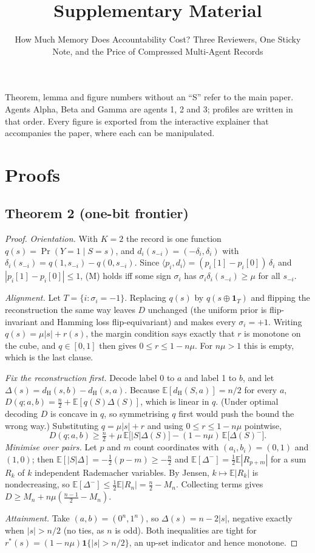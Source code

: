 \documentclass[sigconf,anonymous,acmthm=false]{acmart}
\theoremstyle{acmplain}
\theoremstyle{acmdefinition}
\newcommand{\E}{\mathbb{E}}
\newcommand{\dH}{d_{\mathrm{H}}}
\begin{document}
\title{Supplementary Material}
\subtitle{How Much Memory Does Accountability Cost? Three Reviewers, One Sticky Note, and the Price of Compressed Multi-Agent Records}
\maketitle

Theorem, lemma and figure numbers without an ``S'' refer to the main paper. Agents
\textsf{Alpha}, \textsf{Beta} and \textsf{Gamma} are agents 1, 2 and 3; profiles are written
in that order. Every figure is exported from the interactive explainer that accompanies the
paper, where each can be manipulated.

\appendix
\section{Proofs}

\subsection{Theorem 2 (one-bit frontier)}
\begin{proof}
\emph{Orientation.} With $K=2$ the record is one function $q(s)=\Pr(Y=1\mid S=s)$, and
$d_i(s_{-i})=(-\delta_i,\delta_i)$ with $\delta_i(s_{-i})=q(1,s_{-i})-q(0,s_{-i})$. Since
$\langle p_i,d_i\rangle=(p_i[1]-p_i[0])\,\delta_i$ and $|p_i[1]-p_i[0]|\le1$, (M) holds iff
some sign $\sigma_i$ has $\sigma_i\delta_i(s_{-i})\ge\mu$ for all $s_{-i}$.

\emph{Alignment.} Let $T=\{i:\sigma_i=-1\}$. Replacing $q(s)$ by $q(s\oplus\mathbf1_T)$ and
flipping the reconstruction the same way leaves $D$ unchanged (the uniform prior is
flip-invariant and Hamming loss flip-equivariant) and makes every $\sigma_i=+1$. Writing
$q(s)=\mu|s|+r(s)$, the margin condition says exactly that $r$ is monotone on the cube, and
$q\in[0,1]$ then gives $0\le r\le1-n\mu$. For $n\mu>1$ this is empty, which is the last clause.

\emph{Fix the reconstruction first.} Decode label 0 to $a$ and label 1 to $b$, and let
$\Delta(s)=\dH(s,b)-\dH(s,a)$. Because $\E[\dH(S,a)]=n/2$ for every $a$,
$D(q;a,b)=\frac n2+\E[q(S)\Delta(S)]$, which is linear in $q$. (Under optimal decoding $D$ is
concave in $q$, so symmetrising $q$ first would push the bound the wrong way.) Substituting
$q=\mu|s|+r$ and using $0\le r\le1-n\mu$ pointwise,
\[ D(q;a,b)\ge\tfrac n2+\mu\,\E\big[|S|\Delta(S)\big]-(1-n\mu)\,\E\big[\Delta(S)^-\big]. \]
\emph{Minimise over pairs.} Let $p$ and $m$ count coordinates with $(a_i,b_i)=(0,1)$ and
$(1,0)$; then $\E[|S|\Delta]=-\frac12(p-m)\ge-\frac n2$ and $\E[\Delta^-]=\frac12\E|R_{p+m}|$
for a sum $R_k$ of $k$ independent Rademacher variables. By Jensen, $k\mapsto\E|R_k|$ is
nondecreasing, so $\E[\Delta^-]\le\frac12\E|R_n|=\frac n2-M_n$. Collecting terms gives
$D\ge M_n+n\mu(\frac{n-1}2-M_n)$.

\emph{Attainment.} Take $(a,b)=(0^n,1^n)$, so $\Delta(s)=n-2|s|$, negative exactly when
$|s|>n/2$ (no ties, as $n$ is odd). Both inequalities are tight for
$r^*(s)=(1-n\mu)\mathbf1\{|s|>n/2\}$, an up-set indicator and hence monotone.
\end{proof}
\end{document}
